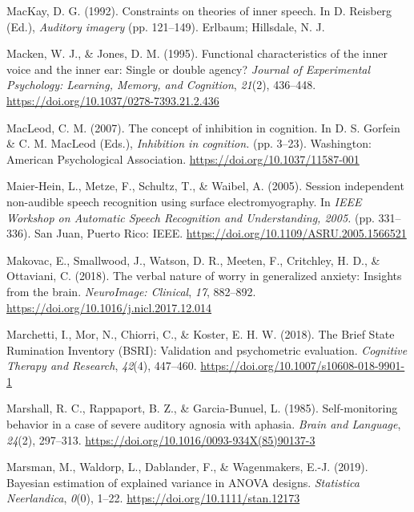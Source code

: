 \documentclass[a4paper,12pt,twoside,onecolumn,openright,final,oldfontcommands]{memoir}
\begin{document}
\leavevmode\hypertarget{ref-mackay_constraints_1992}{}%
MacKay, D. G. (1992). Constraints on theories of inner speech. In D. Reisberg (Ed.), \emph{Auditory imagery} (pp. 121--149). Erlbaum; Hillsdale, N. J.

\leavevmode\hypertarget{ref-macken_functional_1995}{}%
Macken, W. J., \& Jones, D. M. (1995). Functional characteristics of the inner voice and the inner ear: Single or double agency? \emph{Journal of Experimental Psychology: Learning, Memory, and Cognition}, \emph{21}(2), 436--448. \url{https://doi.org/10.1037/0278-7393.21.2.436}

\leavevmode\hypertarget{ref-gorfein_concept_2007}{}%
MacLeod, C. M. (2007). The concept of inhibition in cognition. In D. S. Gorfein \& C. M. MacLeod (Eds.), \emph{Inhibition in cognition.} (pp. 3--23). Washington: American Psychological Association. \url{https://doi.org/10.1037/11587-001}

\leavevmode\hypertarget{ref-maier-hein_session_2005}{}%
Maier-Hein, L., Metze, F., Schultz, T., \& Waibel, A. (2005). Session independent non-audible speech recognition using surface electromyography. In \emph{IEEE Workshop on Automatic Speech Recognition and Understanding, 2005.} (pp. 331--336). San Juan, Puerto Rico: IEEE. \url{https://doi.org/10.1109/ASRU.2005.1566521}

\leavevmode\hypertarget{ref-makovac_verbal_2018}{}%
Makovac, E., Smallwood, J., Watson, D. R., Meeten, F., Critchley, H. D., \& Ottaviani, C. (2018). The verbal nature of worry in generalized anxiety: Insights from the brain. \emph{NeuroImage: Clinical}, \emph{17}, 882--892. \url{https://doi.org/10.1016/j.nicl.2017.12.014}

\leavevmode\hypertarget{ref-marchetti_brief_2018}{}%
Marchetti, I., Mor, N., Chiorri, C., \& Koster, E. H. W. (2018). The Brief State Rumination Inventory (BSRI): Validation and psychometric evaluation. \emph{Cognitive Therapy and Research}, \emph{42}(4), 447--460. \url{https://doi.org/10.1007/s10608-018-9901-1}

\leavevmode\hypertarget{ref-marshall_self-monitoring_1985}{}%
Marshall, R. C., Rappaport, B. Z., \& Garcia-Bunuel, L. (1985). Self-monitoring behavior in a case of severe auditory agnosia with aphasia. \emph{Brain and Language}, \emph{24}(2), 297--313. \url{https://doi.org/10.1016/0093-934X(85)90137-3}

\leavevmode\hypertarget{ref-marsman_bayesian_2019}{}%
Marsman, M., Waldorp, L., Dablander, F., \& Wagenmakers, E.-J. (2019). Bayesian estimation of explained variance in ANOVA designs. \emph{Statistica Neerlandica}, \emph{0}(0), 1--22. \url{https://doi.org/10.1111/stan.12173}
\end{document}
